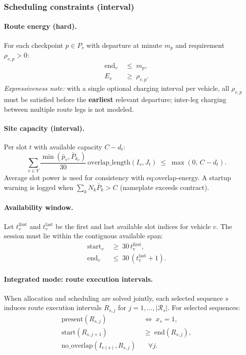 \documentclass[11pt,a4paper]{article}
\newcommand{\1}{\mathbf{1}}
\begin{document}
\subsubsection{Scheduling constraints (interval)}

\paragraph{Route energy (hard).}
For each checkpoint $p \in P_v$ with departure at minute $m_p$ and requirement $\rho_{v,p} > 0$:
\begin{align}
  \mathrm{end}_v &\;\le\; m_p, \\
  E_v &\;\ge\; \rho_{v,p}.
\end{align}
\emph{Expressiveness note:} with a single optional charging interval per vehicle,
all $\rho_{v,p}$ must be satisfied before the \textbf{earliest} relevant departure;
inter-leg charging between multiple route legs is not modeled.

\paragraph{Site capacity (interval).}
Per slot $t$ with available capacity $C - d_t$:
\begin{equation}
  \label{eq:site-capacity-interval}
  \sum_{v \in V} \frac{\min(\bar{p}_v, \bar{P}_{k_v})}{30}\,
  \mathrm{overlap\_length}(I_v, J_t)
  \;\le\; \max(0,\, C - d_t).
\end{equation}
Average slot power is used for consistency with eq:overlap-energy. A startup warning
is logged when $\sum_k N_k \bar{P}_k > C$ (nameplate exceeds contract).

\paragraph{Availability window.}
Let $t_v^{\mathrm{first}}$ and $t_v^{\mathrm{last}}$ be the first and last available slot
indices for vehicle $v$. The session must lie within the contiguous available span:
\begin{align}
  \mathrm{start}_v &\;\ge\; 30\, t_v^{\mathrm{first}}, \\
  \mathrm{end}_v &\;\le\; 30\,(t_v^{\mathrm{last}} + 1).
\end{align}

\paragraph{Integrated mode: route execution intervals.}
When allocation and scheduling are solved jointly, each selected sequence $s$ induces
route execution intervals $R_{s,j}$ for $j = 1,\ldots,|\mathcal{R}_s|$. For selected
sequences:
\begin{align}
  \mathrm{present}(R_{s,j}) &\;\Leftrightarrow\; x_s = 1, \\
  \mathrm{start}(R_{s,j+1}) &\;\ge\; \mathrm{end}(R_{s,j}), \\
  \mathrm{no\_overlap}(I_{v(s)}, R_{s,j}) &\quad \forall j.
\end{align}
\end{document}
